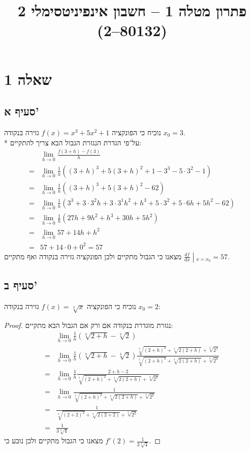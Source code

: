 
\title{פתרון מטלה 1 – חשבון אינפיניטסימלי 2 (80132--2)}


\maketitle
\maketitleprint{}

\section{שאלה 1}
\subsection{סעיף א'}
נוכיח כי הפונקציה $f(x) = x^3 + 5x^2 + 1$ גזירה בנקודה $x_0 = 3$. \\*
על־פי הגדרת הנגזרת הגבול הבא צריך להתקיים:
\begin{align*}
	& \lim_{h \to 0} \frac{f(3 + h) - f(3)}{h} \\
	= & \lim_{h \to 0} \frac{1}{h} ({(3 + h)}^3 + 5{(3 + h)}^2 + 1 - 3^3 - 5 \cdot 3^2 - 1) \\
	= & \lim_{h \to 0} \frac{1}{h} ({(3 + h)}^3 + 5{(3 + h)}^2 - 62) \\
	= & \lim_{h \to 0} \frac{1}{h} (3^3 + 3 \cdot 3^2 h + 3 \cdot 3^1 h^2 + h^3 + 5\cdot 3^2 + 5 \cdot 6h + 5h^2 - 62) \\
	= & \lim_{h \to 0} \frac{1}{h} (27 h + 9 h^2 + h^3 + 30h + 5h^2) \\
	= & \lim_{h \to 0} 57 + 14 h + h^2 \\
	= & 57 + 14 \cdot 0 + 0^2 = 57
\end{align*}
מצאנו כי הגבול מתקיים ולכן הפונקציה גזירה בנקודה ואף מתקיים $\left. \frac{df}{dx}\middle\vert_{x = x_0}\right. = 57$.

\subsection{סעיף ב'}
נוכיח כי הפונקציה $f(x) = \sqrt[3]{x}$ גזירה בנקודה $x_0 = 2$:
\begin{proof}
	נגזרת מוגדרת בנקודה אם ורק אם הגבול הבא מתקיים:
	\begin{align*}
		& \lim_{h \to 0} \frac{1}{h} \left(\sqrt[3]{2 + h} - \sqrt[3]{2}\right) \\
		= & \lim_{h \to 0} \frac{1}{h} \left(\sqrt[3]{2 + h} - \sqrt[3]{2}\right) \frac{\sqrt[3]{{(2 + h)}^2} + \sqrt[3]{2(2 + h)} + \sqrt[3]{2^2}}{\sqrt[3]{{(2 + h)}^2} + \sqrt[3]{2(2 + h)} + \sqrt[3]{2^2}} \\
		= & \lim_{h \to 0} \frac{1}{h} \frac{2 + h - 2}{\sqrt[3]{{(2 + h)}^2} + \sqrt[3]{2(2 + h)} + \sqrt[3]{2^2}} \\
		= & \lim_{h \to 0} \frac{1}{\sqrt[3]{{(2 + h)}^2} + \sqrt[3]{2(2 + h)} + \sqrt[3]{2^2}} \\
		= & \frac{1}{\sqrt[3]{{(2 + 2)}^2} + \sqrt[3]{2(2 + 2)} + \sqrt[3]{2^2}} \\
		= & \frac{1}{3 \sqrt[3]{4}}
	\end{align*}
	מצאנו כי הגבול מתקיים ולכן נובע כי $f'(2) = \frac{1}{3 \sqrt[3]{4}}$.
\end{proof}


